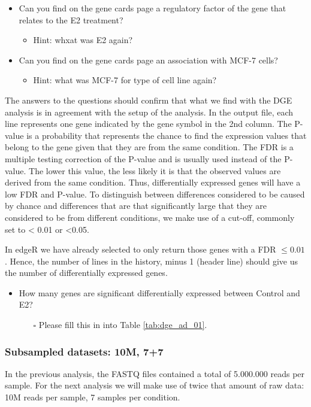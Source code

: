 \documentclass[11pt,a4paper]{article}
\begin{document}
\begin{itemize}
	\item Can you find on the gene cards page a regulatory factor of the gene that relates
to the E2 treatment?
	\begin{itemize}
		\item Hint: whxat was E2 again?
	\end{itemize}
	\item Can you find on the gene cards page an association with MCF-7 cells?
	\begin{itemize}
		\item Hint: what was MCF-7 for type of cell line again?
	\end{itemize}
\end{itemize}
The answers to the questions should confirm that what we find with the DGE analysis is in agreement with the setup of the analysis. In the output file, each line represents one gene indicated by the gene symbol in the 2nd column. The P-value is a probability that represents the chance to find the expression values that belong to the gene given that
they are from the same condition. The FDR is a multiple testing correction of the P-value and is usually used instead of the P-value. The lower this value, the less likely it is that the observed values are derived from the same condition. Thus, differentially expressed genes will have a low FDR and P-value. To distinguish between differences
considered to be caused by chance and differences that are that significantly large that they are considered to be from different conditions, we make use of a cut-off, commonly set to < 0.01 or <0.05.

In edgeR we have already selected to only return those genes with a FDR $\leq 0.01$. Hence, the number of lines in the history, minus 1 (header line) should give us the number of differentially expressed genes.
\begin{itemize}
	\item How many genes are significant differentially expressed between Control and E2? 
	\begin{itemize}
		\item[$\square$] Please fill this in into Table \ref{tab:dge_ad_01}.
	\end{itemize}
\end{itemize}

\subsubsection{Subsampled datasets: 10M, 7+7}
In the previous analysis, the FASTQ files contained a total of 5.000.000 reads per sample. For the next analysis we will make use of twice that amount of raw data: 10M reads per sample, 7 samples per condition.
\end{document}
